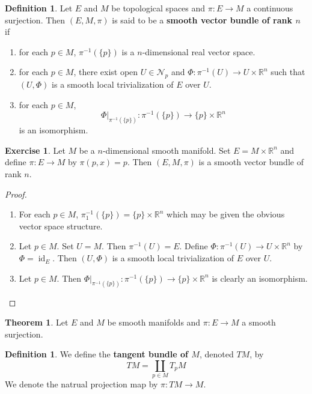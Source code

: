 \documentclass[12pt]{amsart}
\theoremstyle{definition}
\newtheorem{defn}[definition]{Definition}
\newtheorem{thm}[definition]{Theorem}
\newtheorem{ex}[definition]{Exercise}
\newcommand{\R}{\mathbb{R}}
\newcommand{\MN}{\mathcal{N}}
\DeclareMathOperator{\id}{id}
\begin{document}
	\begin{defn}
		Let $E$ and $M$ be topological spaces and $\pi: E \rightarrow M$ a continuous surjection. Then $(E, M, \pi)$ is said to be a \textbf{smooth vector bundle of rank $n$} if 
		\begin{enumerate}
			\item for each $p \in M$, $\pi^{-1}(\{p\})$ is a $n$-dimensional real vector space.
			\item for each $p \in M$, there exist open $U \in \MN_p$ and $\Phi: \pi^{-1}(U) \rightarrow U \times \R^n$ such that $(U, \Phi)$ is a smooth local trivialization of $E$ over $U$.
			\item for each $p \in M$, $$\Phi|_{\pi^{-1}(\{p\})}: \pi^{-1}(\{p\}) \rightarrow \{p\} \times \R^n$$ is an isomorphism. 
		\end{enumerate}
	\end{defn}

\begin{ex}
Let $M$ be a $n$-dimensional smooth manifold. Set $E = M \times \R^n$ and define $\pi: E \rightarrow M$ by $\pi(p, x) = p $. Then $(E, M, \pi)$ is a smooth vector bundle of rank $n$.
\end{ex}

\begin{proof}\
\begin{enumerate}
\item For each $p \in M$, $\pi_1^{-1}(\{p\}) = \{p\} \times \R^n$ which may be given the obvious vector space structure.
\item Let $p \in M$. Set $U = M$. Then $\pi^{-1}(U) = E$. Define $\Phi: \pi^{-1}(U) \rightarrow U \times \R^n$ by $\Phi = \id_E$. Then $(U, \Phi)$ is a smooth local trivialization of $E$ over $U$.   
\item Let $p \in M$. Then $\Phi|_{\pi^{-1}(\{p\})}: \pi^{-1}(\{p\}) \rightarrow \{p\} \times \R^n$ is clearly an isomorphism. 
\end{enumerate}
\end{proof}

	\begin{thm}
		Let $E$ and $M$ be smooth manifolds and $\pi: E \rightarrow M$ a smooth surjection.
	\end{thm}
	
	
	\newpage
	
	\begin{defn}
		We define the \textbf{tangent bundle of $M$}, denoted $TM$, by $$TM = \coprod_{p \in M} T_pM$$ 
		We denote the natrual projection map by $\pi: TM \rightarrow M$.
	\end{defn}
	
\end{document}
